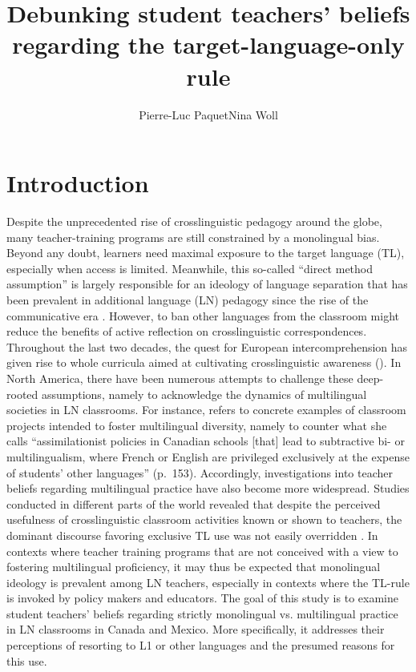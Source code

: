 \documentclass[output=paper]{../langscibook}
\author{Pierre-Luc Paquet\affiliation{University of Guanajuato}\lastand Nina Woll\affiliation{University of Quebec at Trois-Rivieres}}
\title{Debunking student teachers’ beliefs regarding the target-language-only rule}
\begin{document}
\maketitle
{}


\section{Introduction}


Despite the unprecedented rise of crosslinguistic pedagogy around the globe, many teacher-training programs are still constrained by a monolingual bias. Beyond any doubt, learners need maximal exposure to the target language (TL), especially when access is limited. Meanwhile, this so-called “direct method assumption” is largely responsible for an ideology of language separation that has been prevalent in additional language (LN) pedagogy since the rise of the communicative era \citep{Cummins2007}. However, to ban other languages from the classroom might reduce the benefits of active reflection on crosslinguistic correspondences. Throughout the last two decades, the quest for European intercomprehension has given rise to whole curricula aimed at cultivating crosslinguistic awareness (\citealt{CouncilOfEurope2001}). In North America, there have been numerous attempts to challenge these deep-rooted assumptions, namely to acknowledge the dynamics of multilingual societies in LN classrooms. For instance, \citet{Duff2007} refers to concrete examples of classroom projects intended to foster multilingual diversity, namely to counter what she calls “assimilationist policies in Canadian schools [that] lead to subtractive bi- or multilingualism, where French or English are privileged exclusively at the expense of students’ other languages” (p.~153). Accordingly, investigations into teacher beliefs regarding multilingual practice have also become more widespread. Studies conducted in different parts of the world revealed that despite the perceived usefulness of crosslinguistic classroom activities known or shown to teachers, the dominant discourse favoring exclusive TL use was not easily overridden \citep{ArocenaEgañaEtAl2015,Haukås2016,MartinezEtAl2015}. In contexts where teacher training programs that are not conceived with a view to fostering multilingual proficiency, it may thus be expected that monolingual ideology is prevalent among LN teachers, especially in contexts where the TL-rule is invoked by policy makers and educators. The goal of this study is to examine student teachers’ beliefs regarding strictly monolingual vs. multilingual practice in LN classrooms in Canada and Mexico. More specifically, it addresses their perceptions of resorting to L1 or other languages and the presumed reasons for this use.
\end{document}
